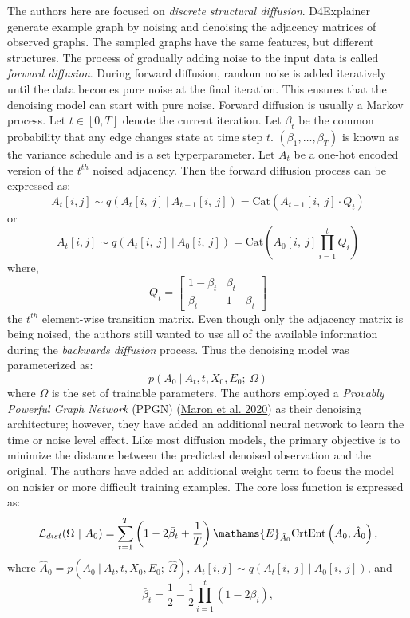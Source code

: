 \documentclass[
  11pt,
  letterpaper,
]{article}
\begin{document}
\quad The authors here are focused on \emph{discrete structural
diffusion}. D4Explainer generate example graph by noising and denoising
the adjacency matrices of observed graphs. The sampled graphs have the
same features, but different structures. The process of gradually adding
noise to the input data is called \emph{forward diffusion}. During
forward diffusion, random noise is added iteratively until the data
becomes pure noise at the final iteration. This ensures that the
denoising model can start with pure noise. Forward diffusion is usually
a Markov process. Let \(t \in [0, T]\) denote the current iteration. Let
\(\beta_t\) be the common probability that any edge changes state at
time step \(t\). \((\beta_1, \dots, \beta_T)\) is known as the variance
schedule and is a set hyperparameter. Let \(A_t\) be a one-hot encoded
version of the \(t^{th}\) noised adjacency. Then the forward diffusion
process can be expressed as:\\
\begin{equation}
         A_t[i, j] \sim q(A_t[i, \ j] \ | \ A_{t-1}[i, \ j]) 
            = \text{Cat}(A_{t-1}[i, \ j] \cdot Q_t)
    \end{equation} or \begin{equation}
         A_t[i, j] \sim q(A_t[i, \ j] \ | \ A_{0}[i, \ j]) 
            = \text{Cat}\left(A_0[i, \ j] \prod_{i=1}^t  Q_i \right)
    \end{equation} where, \[
    Q_t = 
    \left[
    \begin{matrix}
        1-\beta_t & \beta_t \\ 
        \beta_t & 1 - \beta_t
    \end{matrix}
    \right]
    \] the \(t^{th}\) element-wise transition matrix. Even though only
the adjacency matrix is being noised, the authors still wanted to use
all of the available information during the \emph{backwards diffusion}
process. Thus the denoising model was parameterized as: \begin{equation}
         p(A_0 \ | \ A_t, t, X_0, E_0; \ \Omega)  
    \end{equation} where \(\Omega\) is the set of trainable parameters.
The authors employed a \emph{Provably Powerful Graph Network} (PPGN)
(\protect\hyperlink{ref-Maron_Ben-Hamu_Serviansky_Lipman_2020}{Maron et
al. 2020}) as their denoising architecture; however, they have added an
additional neural network to learn the time or noise level effect. Like
most diffusion models, the primary objective is to minimize the distance
between the predicted denoised observation and the original. The authors
have added an additional weight term to focus the model on noisier or
more difficult training examples. The core loss function is expressed
as: \begin{equation} \label{L-dist}
        \mathcal{L}_{dist} (\Omega \ | \ A_0) =  \sum_{t=1}^T 
            \left(1 - 2 \bar \beta_t + \dfrac 1 T \right)
            \mathams{E}_{\hat A_0}
            \text{CrtEnt} \left(
                A_0, \hat A_0
            \right), 
    \end{equation} where
\(\hat A_0 = p(A_0 \ | \ A_t, t, X_0, E_0; \ \hat \Omega)\),
\(A_t[i, j] \sim q(A_t[i, \ j] \ | \ A_{0}[i, \ j])\), and \[
    \bar \beta_t = \frac 1 2 - \frac 1 2 \prod^t_{i=1}(1-2\beta_i), 
\]
\end{document}
